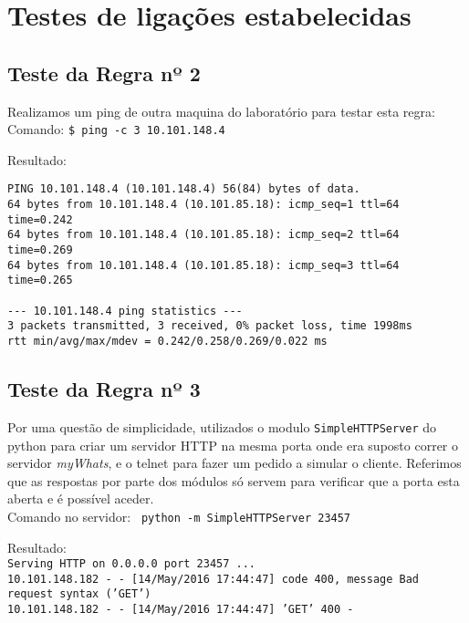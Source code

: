 \documentclass[12pt, a4paper, twoside]{report} %
\begin{document}
\clearpage

\section{Testes de ligações estabelecidas}

\subsection{Teste da Regra nº 2}

\noindent Realizamos um ping de outra maquina do laboratório para testar esta regra: \\

\noindent Comando: \texttt{\$ ping -c 3 10.101.148.4}

\noindent Resultado:

\begin{lstlisting}
PING 10.101.148.4 (10.101.148.4) 56(84) bytes of data.
64 bytes from 10.101.148.4 (10.101.85.18): icmp_seq=1 ttl=64 time=0.242
64 bytes from 10.101.148.4 (10.101.85.18): icmp_seq=2 ttl=64 time=0.269
64 bytes from 10.101.148.4 (10.101.85.18): icmp_seq=3 ttl=64 time=0.265

--- 10.101.148.4 ping statistics ---
3 packets transmitted, 3 received, 0% packet loss, time 1998ms
rtt min/avg/max/mdev = 0.242/0.258/0.269/0.022 ms
\end{lstlisting}

\subsection{Teste da Regra nº 3}

\noindent Por uma questão de simplicidade, utilizados o modulo \texttt{SimpleHTTPServer} do python para criar um servidor HTTP na mesma porta onde era suposto correr o servidor \textit{myWhats}, e o telnet para fazer um pedido a simular o cliente. Referimos que as respostas por parte dos módulos só servem para verificar que a porta esta aberta e é possível aceder. \\

\noindent Comando no servidor: \texttt{ python -m SimpleHTTPServer 23457}

\noindent Resultado: \\

\noindent \texttt{Serving HTTP on 0.0.0.0 port 23457 ...} \\
\noindent \texttt{10.101.148.182 - - [14/May/2016 17:44:47] code 400, message Bad request syntax ('GET')} \\
\texttt{10.101.148.182 - - [14/May/2016 17:44:47] 'GET' 400 -} \\
\end{document}
